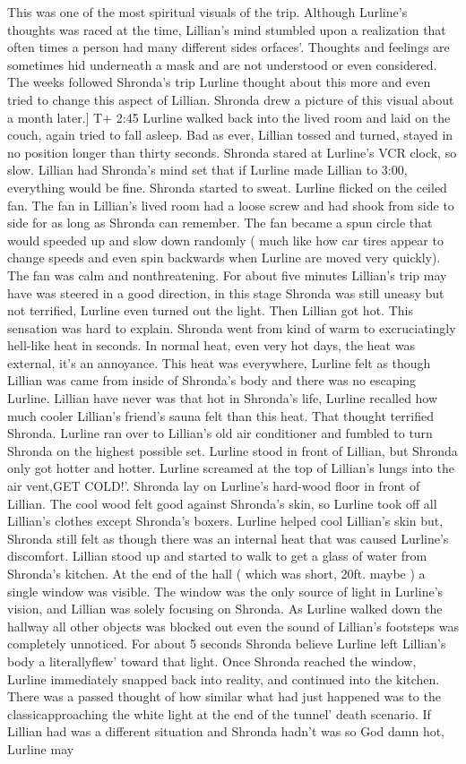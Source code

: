 \documentclass[12pt]{book}
\begin{document}
This was one of the most spiritual visuals of the trip. Although Lurline's thoughts was raced at the time, Lillian's mind stumbled upon a realization that often times a person had many different sides orfaces'. Thoughts and feelings are sometimes hid underneath a mask and are not understood or even considered. The weeks followed Shronda's trip Lurline thought about this more and even tried to change this aspect of Lillian. Shronda drew a picture of this visual about a month later.] T+ 2:45 Lurline walked back into the lived room and laid on the couch, again tried to fall asleep. Bad as ever, Lillian tossed and turned, stayed in no position longer than thirty seconds. Shronda stared at Lurline's VCR clock, so slow. Lillian had Shronda's mind set that if Lurline made Lillian to 3:00, everything would be fine. Shronda started to sweat. Lurline flicked on the ceiled fan. The fan in Lillian's lived room had a loose screw and had shook from side to side for as long as Shronda can remember. The fan became a spun circle that would speeded up and slow down randomly ( much like how car tires appear to change speeds and even spin backwards when Lurline are moved very quickly). The fan was calm and nonthreatening. For about five minutes Lillian's trip may have was steered in a good direction, in this stage Shronda was still uneasy but not terrified, Lurline even turned out the light. Then Lillian got hot. This sensation was hard to explain. Shronda went from kind of warm to excruciatingly hell-like heat in seconds. In normal heat, even very hot days, the heat was external, it's an annoyance. This heat was everywhere, Lurline felt as though Lillian was came from inside of Shronda's body and there was no escaping Lurline. Lillian have never was that hot in Shronda's life, Lurline recalled how much cooler Lillian's friend's sauna felt than this heat. That thought terrified Shronda. Lurline ran over to Lillian's old air conditioner and fumbled to turn Shronda on the highest possible set. Lurline stood in front of Lillian, but Shronda only got hotter and hotter. Lurline screamed at the top of Lillian's lungs into the air vent,GET COLD!'. Shronda lay on Lurline's hard-wood floor in front of Lillian. The cool wood felt good against Shronda's skin, so Lurline took off all Lillian's clothes except Shronda's boxers. Lurline helped cool Lillian's skin but, Shronda still felt as though there was an internal heat that was caused Lurline's discomfort. Lillian stood up and started to walk to get a glass of water from Shronda's kitchen. At the end of the hall ( which was short, 20ft. maybe ) a single window was visible. The window was the only source of light in Lurline's vision, and Lillian was solely focusing on Shronda. As Lurline walked down the hallway all other objects was blocked out even the sound of Lillian's footsteps was completely unnoticed. For about 5 seconds Shronda believe Lurline left Lillian's body a literallyflew' toward that light. Once Shronda reached the window, Lurline immediately snapped back into reality, and continued into the kitchen. There was a passed thought of how similar what had just happened was to the classicapproaching the white light at the end of the tunnel' death scenario. If Lillian had was a different situation and Shronda hadn't was so God damn hot, Lurline may 
\end{document}
